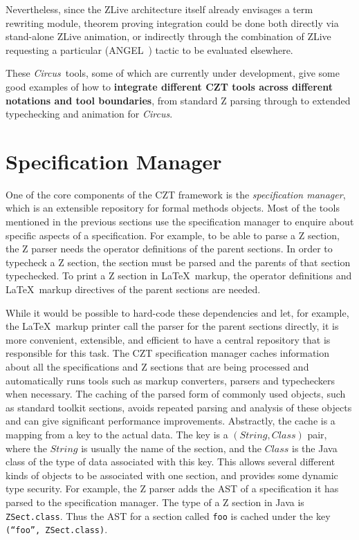 \documentclass{llncs}
\newcommand{\Circus}{{\sf\slshape Circus}}
\newcommand{\Interface}[1]{\texttt{#1}}
\begin{document}
    Nevertheless, since the ZLive architecture itself already envisages a term
    rewriting module, theorem proving integration could be done both directly
    via stand-alone ZLive animation, or indirectly through the combination of
    ZLive requesting a particular (ANGEL~\cite{z.others:angel}) tactic to be
    evaluated elsewhere.

    These \Circus\ tools, some of which are currently under development,
    give some good examples of how to \textbf{integrate different CZT
    tools across different notations and tool boundaries}, from standard
    Z parsing through to extended typechecking and animation for \Circus.


\section{Specification Manager}
\label{section-manager}

  One of the core components of the CZT framework is the
  \emph{specification manager}, which is an extensible repository for
  formal methods objects.  Most of the tools mentioned in the previous
  sections use the specification manager to enquire about specific
  aspects of a specification.  For example, to be able to parse a Z
  section, the Z parser needs the operator definitions of the parent
  sections.  In order to typecheck a Z section, the section must be
  parsed and the parents of that section typechecked.  To print a Z
  section in \LaTeX\ markup, the operator definitions and \LaTeX\
  markup directives of the parent sections are needed.

  While it would be possible to hard-code these dependencies and let,
  for example, the \LaTeX\ markup printer call the parser for the
  parent sections directly, it is more convenient, extensible, and
  efficient to have a central repository that is responsible for this
  task.  The CZT specification manager caches information about all
  the specifications and Z sections that are being processed and
  automatically runs tools such as markup converters, parsers and
  typecheckers when necessary.  The caching of the parsed form of
  commonly used objects, such as standard toolkit sections, avoids
  repeated parsing and analysis of these objects and can give
  significant performance improvements.  Abstractly, the cache is a
  mapping from a key to the actual data.  The key is a
  $(String,Class)$ pair, where the $String$ is usually the name of the
  section, and the $Class$ is the Java class of the type of data
  associated with this key.  This allows several different kinds of
  objects to be associated with one section, and provides some dynamic
  type security.  For example, the Z parser adds the AST of a
  specification it has parsed to the specification manager.  The type
  of a Z section in Java is \Interface{ZSect.class}. Thus the AST for
  a section called \texttt{foo} is cached under the key
  \texttt{(``foo'',~ZSect.class)}.
\end{document}
